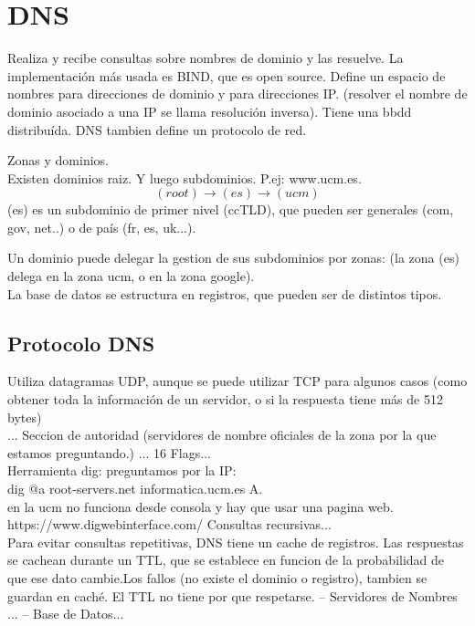 \section{DNS}
Realiza y recibe consultas sobre nombres de dominio y las resuelve. La implementación más usada es BIND, que es open source. Define un espacio de nombres para direcciones de dominio y para direcciones IP. (resolver el nombre de dominio asociado a una IP se llama resolución inversa). Tiene una bbdd distribuída. DNS tambien define un protocolo de red.

Zonas y dominios.
\\Existen dominios raiz. Y luego subdominios. P.ej: www.ucm.es.
\\
\[(root) \rightarrow (es) \rightarrow (ucm)\]
(es) es un subdominio de primer nivel (ccTLD), que pueden ser generales (com, gov, net..) o de país (fr, es, uk...).

Un dominio puede delegar la gestion de sus subdominios por zonas: (la zona (es) delega en la zona ucm, o en la zona google).
\\

La base de datos se estructura en registros, que pueden ser de distintos tipos.

\subsection{Protocolo DNS}
Utiliza datagramas UDP, aunque se puede utilizar TCP para algunos casos (como obtener toda la información de un servidor, o si la respuesta tiene más de 512 bytes)
\\
...
Seccion de autoridad (servidores de nombre oficiales de la zona por la que estamos preguntando.)
...
16 Flags...
\\
Herramienta dig: preguntamos por la IP:\\
dig @a root-servers.net informatica.ucm.es A.\\
en la ucm no funciona desde consola y hay que usar una pagina web. https://www.digwebinterface.com/
Consultas recursivas...\\Para evitar consultas repetitivas, DNS tiene un cache de registros. Las respuestas se cachean durante un TTL, que se establece en funcion de la probabilidad de que ese dato cambie.Los fallos (no existe el dominio o registro), tambien se guardan en caché. El TTL no tiene por que respetarse.
-- Servidores de Nombres ...
-- Base de Datos...
